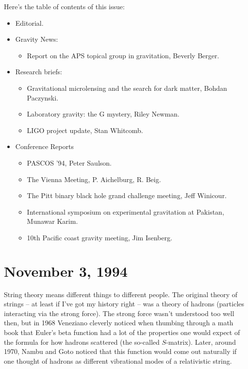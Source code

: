 \documentclass{article}
\def\tightlist{}
\begin{document}
Here's the table of contents of this issue:

\begin{itemize}
\tightlist
\item
  Editorial.
\item
  Gravity News:

  \begin{itemize}
  \tightlist
  \item
    Report on the APS topical group in gravitation, Beverly Berger.
  \end{itemize}
\item
  Research briefs:

  \begin{itemize}
  \tightlist
  \item
    Gravitational microlensing and the search for dark matter, Bohdan
    Paczynski.
  \item
    Laboratory gravity: the G mystery, Riley Newman.
  \item
    LIGO project update, Stan Whitcomb.
  \end{itemize}
\item
  Conference Reports

  \begin{itemize}
  \tightlist
  \item
    PASCOS '94, Peter Saulson.
  \item
    The Vienna Meeting, P. Aichelburg, R. Beig.
  \item
    The Pitt binary black hole grand challenge meeting, Jeff Winicour.
  \item
    International symposium on experimental gravitation at Pakistan,
    Munawar Karim.
  \item
    10th Pacific coast gravity meeting, Jim Isenberg.
  \end{itemize}
\end{itemize}
\hypertarget{week42}{%
\section{November 3, 1994}\label{week42}}

String theory means different things to different people. The original
theory of strings -- at least if I've got my history right -- was a
theory of hadrons (particles interacting via the strong force). The
strong force wasn't understood too well then, but in 1968 Veneziano
cleverly noticed when thumbing through a math book that Euler's beta
function had a lot of the properties one would expect of the formula for
how hadrons scattered (the so-called \(S\)-matrix). Later, around 1970,
Nambu and Goto noticed that this function would come out naturally if
one thought of hadrons as different vibrational modes of a relativistic
string.
\end{document}
